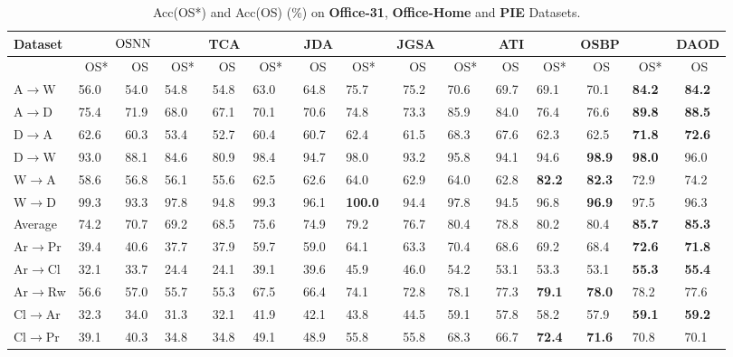 \documentclass[journal]{IEEEtran}
\begin{document}
\begin{table*}[t] \centering
\caption{Acc(OS*) and Acc(OS) (\%) on \textbf{Office-31}, \textbf{Office-Home} and \textbf{PIE} Datasets. } \begin{tabular}{p{0.75cm}p{0.5cm}p{0.5cm}p{0.5cm}p{0.5cm}p{0.5cm}p{0.5cm}p{0.5cm}p{0.5cm}p{0.5cm}p{0.5cm}p{0.5cm}p{0.5cm}p{0.5cm}p{0.5cm}} \hline

Dataset&\multicolumn{2}{p{0.5cm}}{~~~~~${\rm {OSNN}}$}&\multicolumn{2}{p{0.5cm}}{~~~~~~TCA}&\multicolumn{2}{p{0.5cm}}{~~~~~~~JDA}&\multicolumn{2}{p{0.5cm}}{~~~~~~~JGSA}&\multicolumn{2}{p{0.5cm}}{~~~~~~~ATI}&\multicolumn{2}{p{0.5cm}}{~~~~~~OSBP}&\multicolumn{2}{p{0.5cm}}{~~~~~~DAOD}\\ 
\hline
&~OS*&~OS&~OS*&~OS&~OS*&~OS&~OS*&~OS&~OS*&~OS&~OS*&~OS&~OS*&~OS\\
\hline
A$\rightarrow$W  &56.0&54.0&54.8&54.8&63.0&64.8&75.7&75.2&70.6&69.7&69.1&70.1&\textbf{84.2}&\textbf{84.2}\\
A$\rightarrow$D &75.4&71.9&68.0&67.1&70.1&70.6&74.8&73.3&85.9&84.0&76.4&76.6&\textbf{89.8}&\textbf{88.5}\\
D$\rightarrow$A &62.6&60.3&53.4&52.7&60.4&60.7&62.4&61.5&68.3&67.6&62.3&62.5&\textbf{71.8}&\textbf{72.6}\\
D$\rightarrow$W &93.0&88.1&84.6&80.9&98.4&94.7&98.0&93.2&95.8&94.1&94.6&\textbf{98.9}&\textbf{98.0}&96.0\\
W$\rightarrow$A &58.6&56.8&56.1&55.6&62.5&62.6&64.0&62.9&64.0&62.8&\textbf{82.2}&\textbf{82.3}&72.9&74.2\\
W$\rightarrow$D &{99.3}&93.3&97.8&94.8&99.3&96.1&\textbf{100.0}&94.4&97.8&94.5&96.8&\textbf{96.9}&97.5&96.3\\
\hline
Average &74.2&70.7&69.2&68.5&75.6&74.9&79.2&76.7&80.4&78.8&80.2&80.4&\textbf{85.7}&\textbf{85.3}\\
\hline
\hline
Ar$\rightarrow$Pr &39.4&40.6&37.7&37.9&59.7&59.0&64.1&63.3&{70.4}&68.6&{69.2}&68.4&\textbf{72.6}&\textbf{71.8}\\
Ar$\rightarrow$Cl &32.1&33.7&24.4&24.1&39.1&39.6&45.9&46.0&54.2&53.1&53.3&53.1&\textbf{55.3}&\textbf{55.4}\\
Ar$\rightarrow$Rw &56.6&57.0&55.7&55.3&67.5&66.4&74.1&72.8&78.1&77.3&\textbf{79.1}&\textbf{78.0}&{78.2}&{77.6}\\
Cl$\rightarrow$Ar &32.3&34.0&31.3&32.1&41.9&42.1&43.8&44.5&59.1&57.8&58.2&57.9&\textbf{59.1}&\textbf{59.2}\\
Cl$\rightarrow$Pr &39.1&40.3&34.8&34.8&49.1&48.9&55.8&55.8&68.3&66.7&\textbf{72.4}&\textbf{71.6}&70.8&70.1\\

\end{tabular}
\end{table*}
\end{document}
